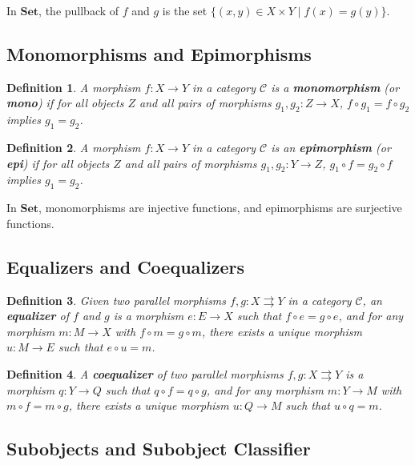 \documentclass{article}
\newtheorem{definition}{Definition}[section]
\begin{document}
In $\mathbf{Set}$, the pullback of $f$ and $g$ is the set $\{ (x,y) \in X \times Y \mid f(x) = g(y) \}$.

\subsection{Monomorphisms and Epimorphisms}

\begin{definition}
A morphism $f \colon X \to Y$ in a category $\mathcal{C}$ is a \textbf{monomorphism} (or \textbf{mono}) if for all objects $Z$ and all pairs of morphisms $g_1, g_2 \colon Z \to X$, $f \circ g_1 = f \circ g_2$ implies $g_1 = g_2$.
\end{definition}

\begin{definition}
A morphism $f \colon X \to Y$ in a category $\mathcal{C}$ is an \textbf{epimorphism} (or \textbf{epi}) if for all objects $Z$ and all pairs of morphisms $g_1, g_2 \colon Y \to Z$, $g_1 \circ f = g_2 \circ f$ implies $g_1 = g_2$.
\end{definition}

In $\mathbf{Set}$, monomorphisms are injective functions, and epimorphisms are surjective functions.

\subsection{Equalizers and Coequalizers}

\begin{definition}
Given two parallel morphisms $f, g \colon X \rightrightarrows Y$ in a category $\mathcal{C}$, an \textbf{equalizer} of $f$ and $g$ is a morphism $e \colon E \to X$ such that $f \circ e = g \circ e$, and for any morphism $m \colon M \to X$ with $f \circ m = g \circ m$, there exists a unique morphism $u \colon M \to E$ such that $e \circ u = m$.
\end{definition}

\begin{definition}
A \textbf{coequalizer} of two parallel morphisms $f, g \colon X \rightrightarrows Y$ is a morphism $q \colon Y \to Q$ such that $q \circ f = q \circ g$, and for any morphism $m \colon Y \to M$ with $m \circ f = m \circ g$, there exists a unique morphism $u \colon Q \to M$ such that $u \circ q = m$.
\end{definition}

\subsection{Subobjects and Subobject Classifier}
\end{document}
